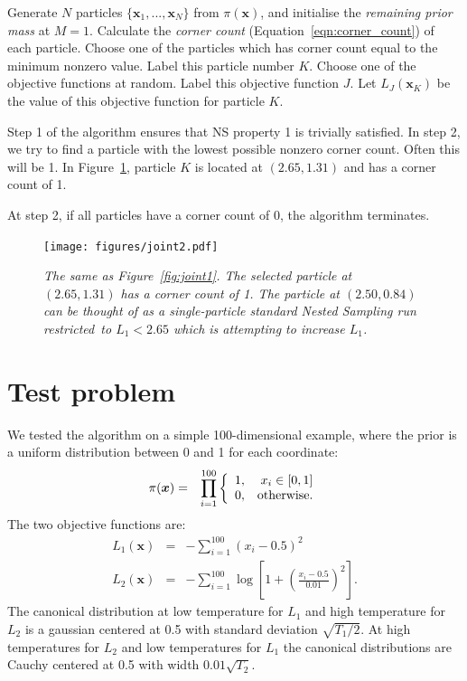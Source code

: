 \documentclass[journal,article,accept,moreauthors,pdftex,12pt,a4paper]{mdpi}
\newcommand{\xx}{\boldsymbol{x}}
\begin{document}
\begin{algorithm}
\begin{algorithmic}
\State Generate $N$ particles $\{\xx_1, ..., \xx_N\}$ from $\pi(\xx)$, and
initialise the {\em remaining prior mass} at $M=1$.
	\State Calculate the {\it corner count} (Equation~\ref{eqn:corner_count})
of each particle.
	\State Choose one of the particles which has corner count equal to the
minimum nonzero value. Label this particle number $K$.
	\State Choose one of the objective functions at random. Label this
objective function $J$. Let $L_{J}(\xx_K)$ be the value of this objective
function for particle $K$.
\EndWhile
\end{algorithmic}
\end{algorithm}

Step 1 of the algorithm ensures that NS property 1 is trivially satisfied.
In step 2, we try to find a particle with the lowest possible nonzero
corner count. Often this will be 1. In Figure~\ref{fig:joint2}, particle $K$
is located at $(2.65, 1.31)$ and has a corner count of 1.



At step 2, if all particles have a corner count of 0, the algorithm terminates.


\begin{figure}
\centering
\texttt{[image: figures/joint2.pdf]}
\caption{\it The same as Figure~\ref{fig:joint1}. The selected particle
at $(2.65, 1.31)$ has a corner count of 1. The particle at
$(2.50, 0.84)$ can be thought of as a single-particle standard Nested Sampling
run restricted to $L_1 < 2.65$ which is attempting to increase $L_1$.
\label{fig:joint2}}
\end{figure}



\section{Test problem}

We tested the algorithm on a simple 100-dimensional example, where the
prior is a uniform distribution between 0 and 1 for each coordinate:
\begin{eqnarray}
\pi(\xx) &=& \prod_{i=1}^{100}
\left\{
\begin{array}{lr}
1, & x_i \in [0, 1]\\
0, & \textnormal{otherwise.}
\end{array}
\right.
\end{eqnarray}
The two objective functions are:
\begin{eqnarray}
L_1(\xx) &=& -\sum_{i=1}^{100} \left(x_i - 0.5\right)^2\\
L_2(\xx) &=& -\sum_{i=1}^{100} \log\left[1 +
\left(\frac{x_i - 0.5}{0.01}\right)^2
\right].
\end{eqnarray}
The canonical distribution at low temperature for $L_1$ and high temperature
for $L_2$ is a gaussian centered at 0.5 with standard deviation
$\sqrt{T_1/2}$. At high temperatures for $L_2$ and low temperatures for $L_1$ the
canonical distributions are Cauchy centered at 0.5 with width
$0.01\sqrt{T_2}$.
\end{document}
